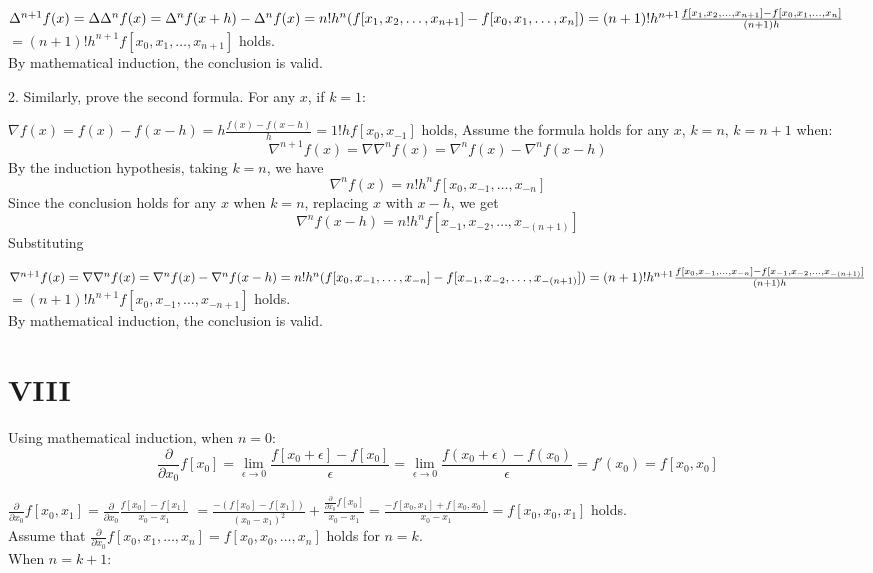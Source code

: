 \documentclass[a4paper]{article}
\begin{document}
$\Delta^{n+1} f(x) = \Delta \Delta^n f(x) = \Delta^n f(x+h) - \Delta^n f(x) = n! h^n (f[x_1, x_2, \ldots, x_{n+1}] - f[x_0, x_1, \ldots, x_n]) \\ 
=(n+1)! h^{n+1} \frac{f[x_1, x_2, \ldots, x_{n+1}] - f[x_0, x_1, \ldots, x_n]}{(n+1)h}$
\(= (n+1)! h^{n+1} f[x_0, x_1, \ldots, x_{n+1}] \) holds.\\
By mathematical induction, the conclusion is valid.

2. Similarly, prove the second formula.
For any \( x \), if \( k = 1 \):

\(\nabla f(x) = f(x) - f(x-h) = h \frac{f(x) - f(x-h)}{h} = 1! h f[x_0, x_{-1}] \) holds,
Assume the formula holds for any \( x \), \( k = n \), \( k = n + 1 \) when:
\[
\nabla^{n+1} f(x) = \nabla \nabla^n f(x) = \nabla^n f(x) - \nabla^n f(x-h)
\]
By the induction hypothesis, taking \( k = n \), we have
\[
\nabla^n f(x) = n! h^n f[x_0, x_{-1}, \ldots, x_{-n}]
\]
Since the conclusion holds for any \( x \) when \( k = n \), replacing \( x \) with \( x - h \), we get
\[
\nabla^n f(x-h) = n! h^n f[x_{-1}, x_{-2}, \ldots, x_{-(n+1)}]
\]
Substituting

$\nabla^{n+1} f(x) = \nabla \nabla^n f(x) = \nabla^n f(x) - \nabla^n f(x-h) = n! h^n (f[x_0, x_{-1}, \ldots, x_{-n}] - f[x_{-1}, x_{-2}, \ldots, x_{-(n+1)}]) \\
= (n+1)! h^{n+1} \frac{f[x_0, x_{-1}, \ldots, x_{-n}] - f[x_{-1}, x_{-2}, \ldots, x_{-(n+1)}]}{(n+1)h}$
\(= (n+1)! h^{n+1} f[x_0, x_{-1}, \ldots, x_{-{n+1}}] \) holds.\\
By mathematical induction, the conclusion is valid.

\section*{VIII}
Using mathematical induction, when \( n = 0 \):
\[
\frac{\partial}{\partial x_0} f[x_0] = \lim_{\epsilon \to 0} \frac{f[x_0 + \epsilon] - f[x_0]}{\epsilon} = \lim_{\epsilon \to 0} \frac{f(x_0 + \epsilon) - f(x_0)}{\epsilon} = f'(x_0) = f[x_0, x_0]
\]

\(\frac{\partial}{\partial x_0} f[x_0, x_1] = \frac{\partial}{\partial x_0} \frac{f[x_0] - f[x_1]}{x_0 - x_1}\)
\(= \frac{-(f[x_0] - f[x_1])}{(x_0 - x_1)^2} + \frac{\frac{\partial}{\partial x_0} f[x_0]}{x_0 - x_1} = \frac{-f[x_0, x_1] + f[x_0, x_0]}{x_0 - x_1} = f[x_0, x_0, x_1] \) holds.\\
Assume that \( \frac{\partial}{\partial x_0} f[x_0, x_1, \ldots, x_n] = f[x_0, x_0, \ldots, x_n] \) holds for \( n = k \).\\
When \( n = k + 1 \):\\
\end{document}
